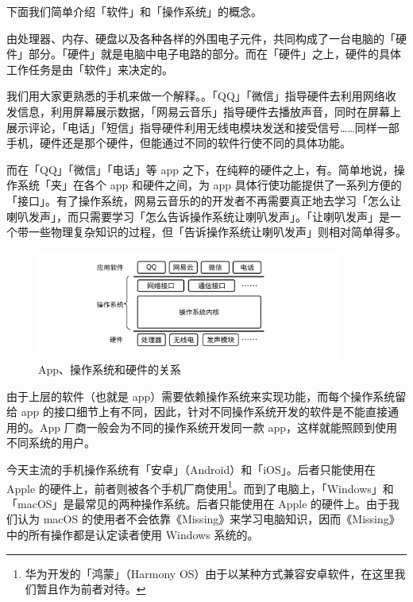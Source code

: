 下面我们简单介绍「软件」和「操作系统」的概念。

由处理器、内存、硬盘以及各种各样的外围电子元件，共同构成了一台电脑的「硬件」部分。「硬件」就是电脑中电子电路的部分。而在「硬件」之上，硬件的具体工作任务是由「软件」来决定的。

我们用大家更熟悉的手机来做一个解释。。「QQ」「微信」指导硬件去利用网络收发信息，利用屏幕展示数据，「网易云音乐」指导硬件去播放声音，同时在屏幕上展示评论，「电话」「短信」指导硬件利用无线电模块发送和接受信号……同样一部手机，硬件还是那个硬件，但能通过不同的软件行使不同的具体功能。

而在「QQ」「微信」「电话」等 app 之下，在纯粹的硬件之上，有。简单地说，操作系统「夹」在各个 app 和硬件之间，为 app 具体行使功能提供了一系列方便的「接口」。有了操作系统，网易云音乐的的开发者不再需要真正地去学习「怎么让喇叭发声」，而只需要学习「怎么告诉操作系统让喇叭发声」。「让喇叭发声」是一个带一些物理复杂知识的过程，但「告诉操作系统让喇叭发声」则相对简单得多。

\begin{figure}[H]
  \centering
  \includegraphics[width=10cm]{assets/Computer_Structure.png}
  \caption{App、操作系统和硬件的关系}
  \label{computer-structure}
\end{figure}

由于上层的软件（也就是 app）需要依赖操作系统来实现功能，而每个操作系统留给 app 的接口细节上有不同，因此，针对不同操作系统开发的软件是不能直接通用的。App 厂商一般会为不同的操作系统开发同一款 app，这样就能照顾到使用不同系统的用户。

今天主流的手机操作系统有「安卓」（Android）和「iOS」。后者只能使用在 Apple 的硬件上，前者则被各个手机厂商使用\footnote{华为开发的「鸿蒙」（Harmony OS）由于以某种方式兼容安卓软件，在这里我们暂且作为前者对待。}。而到了电脑上，「Windows」和「macOS」是最常见的两种操作系统。后者只能使用在 Apple 的硬件上。由于我们认为 macOS 的使用者不会依靠《Missing》来学习电脑知识，因而《Missing》中的所有操作都是认定读者使用 Windows 系统的。

